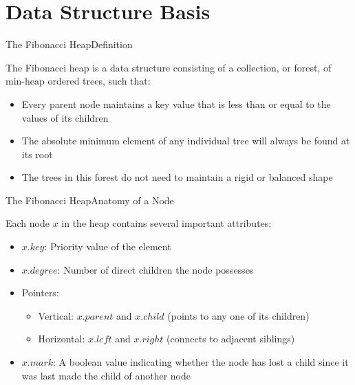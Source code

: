 \documentclass{beamer}
\begin{document}
\section{Data Structure Basis}
\begin{frame}[c]{The Fibonacci Heap}{Definition}
  
  \vspace{0.4cm}

  The Fibonacci heap is a data structure consisting of a collection,
  or forest, of min-heap ordered trees, such that:
  
  \vspace{0.1cm}
  
  \begin{itemize}
    \item Every parent node maintains a key value that is less than or equal to the values of its children
    \item The absolute minimum element of any individual tree will always be found at its root
    \item The trees in this forest do not need to maintain a rigid or balanced shape
  \end{itemize}
  
  \vspace{0.4cm}
  
  \begin{center}
    
  \end{center}

\end{frame}

\begin{frame}[c]{The Fibonacci Heap}{Anatomy of a Node}

  \vspace{0.4cm}

  Each node $x$ in the heap contains several important attributes:
  
  \vspace{0.1cm}
  
  \begin{itemize}
    \item $x.key$: Priority value of the element
    \item $x.degree$: Number of direct children the node possesses
    \item Pointers:
      \begin{itemize}
        \item Vertical: $x.parent$ and $x.child$ (points to any one of its children)
        \item Horizontal: $x.left$ and $x.right$ (connects to adjacent siblings)
      \end{itemize}
    \item $x.mark$: A boolean value indicating whether the node has lost a child since it was last made the child of another node
  \end{itemize}

  \vspace{0.2cm}
  \begin{center}
    
  \end{center}

\end{frame}
\end{document}
